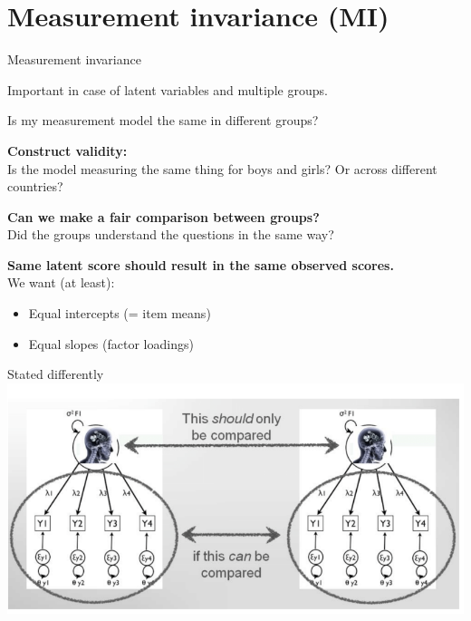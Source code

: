 \documentclass[10pt]{beamer}\usepackage[]{graphicx}\usepackage[]{xcolor}
\begin{document}
\section{Measurement invariance (MI)}
%
%
\begin{frame}{Measurement invariance}

Important in case of latent variables and multiple groups. 
    
\end{frame}
%
\begin{frame}{Is my measurement model the same in different groups?}

\textbf{Construct validity:} \\
Is the model measuring the same thing for boys and girls? Or across different countries? 

\vspace{5mm}

\textbf{Can we make a fair comparison between groups?} \\
Did the groups understand the questions in the same way? 

\vspace{5mm}

\textbf{Same latent score should result in the same observed scores.}\\
We want (at least):
\begin{itemize}
    \item Equal intercepts (= item means)
    \item Equal slopes (factor loadings)
\end{itemize}

\end{frame}
%
\begin{frame}{Stated differently}
    \includegraphics[width=\linewidth,height=\textheight,keepaspectratio]{images/slide105.png}
\end{frame}
\end{document}
